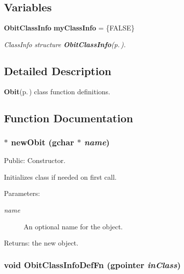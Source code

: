\subsection*{Variables}
\begin{CompactItemize}
\item 
{\bf Obit\-Class\-Info} {\bf my\-Class\-Info} = \{FALSE\}
\begin{CompactList}\small\item\em Class\-Info structure {\bf Obit\-Class\-Info}{\rm (p.\,\pageref{structObitClassInfo})}. \item\end{CompactList}\end{CompactItemize}


\subsection{Detailed Description}
{\bf Obit}{\rm (p.\,\pageref{structObit})} class function definitions. 



\subsection{Function Documentation}
\subsubsection{$\ast$ new\-Obit (gchar $\ast$ {\em name})}\label{Obit_8c_a4}


Public: Constructor. 

Initializes class if needed on first call. \begin{Desc}
\item[Parameters:]
\begin{description}
\item[{\em name}]An optional name for the object. \end{description}
\end{Desc}
\begin{Desc}
\item[Returns:]the new object. \end{Desc}
\subsubsection{\setlength{\rightskip}{0pt plus 5cm}void Obit\-Class\-Info\-Def\-Fn (gpointer {\em in\-Class})}\label{Obit_8c_a16}


